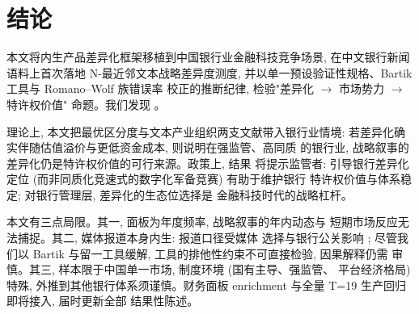 \section{结论}\label{sec:concl}

本文将内生产品差异化框架移植到中国银行业金融科技竞争场景,
在中文银行新闻语料上首次落地 N-最近邻文本战略差异度测度,
并以单一预设验证性规格、Bartik 工具与 Romano--Wolf 族错误率
校正的推断纪律, 检验"差异化 $\to$ 市场势力 $\to$ 特许权价值"
命题。我们发现 \@。

理论上, 本文把最优区分度与文本产业组织两支文献带入银行业情境:
若差异化确实伴随估值溢价与更低资金成本, 则说明在强监管、高同质
的银行业, 战略叙事的差异化仍是特许权价值的可行来源。政策上,
结果  将提示监管者: 引导银行差异化
定位 (而非同质化竞速式的数字化军备竞赛) 有助于维护银行
特许权价值与体系稳定; 对银行管理层, 差异化的生态位选择是
金融科技时代的战略杠杆。

本文有三点局限。其一, 面板为年度频率, 战略叙事的年内动态与
短期市场反应无法捕捉。其二, 媒体报道本身内生: 报道口径受媒体
选择与银行公关影响 \parencite{gurun2012hype}; 尽管我们以 Bartik
与留一工具缓解, 工具的排他性约束不可直接检验, 因果解释仍需
审慎。其三, 样本限于中国单一市场, 制度环境 (国有主导、强监管、
平台经济格局) 特殊, 外推到其他银行体系须谨慎。财务面板
enrichment 与全量 T=19 生产回归即将接入, 届时更新全部
结果性陈述。


\printbibliography


